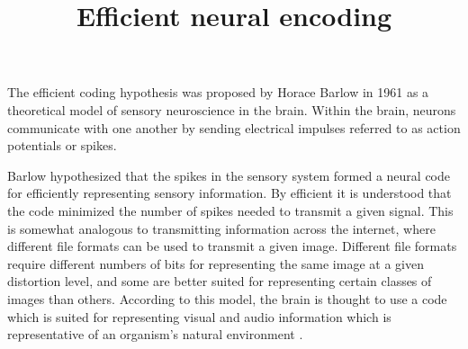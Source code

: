 \documentclass[a4paper]{article}
\title{Efficient neural encoding}
\date{}
\begin{document}
    \maketitle
    The efficient coding hypothesis was proposed by Horace Barlow in 1961 as a theoretical model of sensory neuroscience in the brain. Within the brain, neurons communicate with one another by sending electrical impulses referred to as action potentials or spikes.
    
    Barlow hypothesized that the spikes in the sensory system formed a neural code for efficiently representing sensory information. By efficient it is understood that the code minimized the number of spikes needed to transmit a given signal. This is somewhat analogous to transmitting information across the internet, where different file formats can be used to transmit a given image. Different file formats require different numbers of bits for representing the same image at a given distortion level, and some are better suited for representing certain classes of images than others. According to this model, the brain is thought to use a code which is suited for representing visual and audio information which is representative of an organism's natural environment .
    
    
\end{document}
